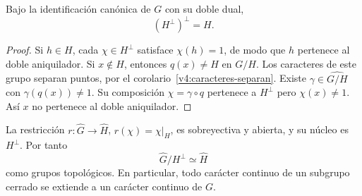 \begin{proposicion}\label{v4:doble-aniquilador}
Bajo la identificación canónica de $G$ con su doble dual,
\[
 (H^\perp)^\perp=H.
\]
\end{proposicion}
\begin{proof}
Si $h\in H$, cada $\chi\in H^\perp$ satisface $\chi(h)=1$, de modo que $h$ pertenece al doble aniquilador. Si $x\notin H$, entonces $q(x)\ne H$ en $G/H$. Los caracteres de este grupo separan puntos, por el corolario~\ref{v4:caracteres-separan}. Existe $\gamma\in\widehat{G/H}$ con $\gamma(q(x))\ne1$. Su composición $\chi=\gamma\circ q$ pertenece a $H^\perp$ pero $\chi(x)\ne1$. Así $x$ no pertenece al doble aniquilador.
\end{proof}

\begin{teorema}\label{v4:dual-exactitud}
La restricción $r:\widehat G\to\widehat H$, $r(\chi)=\chi|_H$, es sobreyectiva y abierta, y su núcleo es $H^\perp$. Por tanto
\[
 \widehat G/H^\perp\simeq\widehat H
\]
como grupos topológicos. En particular, todo carácter continuo de un subgrupo cerrado se extiende a un carácter continuo de $G$.
\end{teorema}
